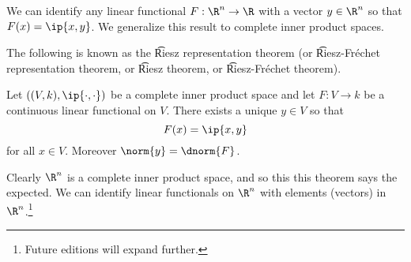 

We can identify any linear functional $F: \R^n \to \R$ with a vector $y \in \R^n$ so that $F(x) = \ip{x,y}$.
We generalize this result to complete inner product spaces.


The following is known as the \t{Riesz representation theorem} (or \t{Riesz-Fr\'echet representation theorem}, or \t{Riesz theorem},  or \t{Riesz-Fr\'echet theorem}).

\begin{proposition}
Let $((V, k), \ip{\cdot,\cdot})$ be a complete inner product space and let $F: V \to k$ be a continuous linear functional on $V$.
There exists a unique $y \in V$ so that
\[
  F(x) = \ip{x, y}
\]
for all $x \in V$. Moreover $\norm{y} = \dnorm{F}$.
\end{proposition}

Clearly $\R^n$ is a complete inner product space, and so this this theorem says the expected. 
We can identify linear functionals on $\R^n$ with elements (vectors) in $\R^n$.\footnote{Future editions will expand further.}

\blankpage
